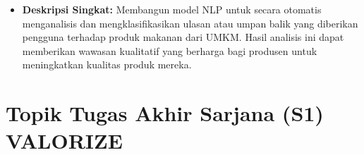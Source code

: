 \documentclass[
  letterpaper,
  DIV=11,
  numbers=noendperiod]{scrreprt}
\providecommand{\tightlist}{%
  \setlength{\itemsep}{0pt}\setlength{\parskip}{0pt}}
\begin{document}
\begin{enumerate}
  \begin{itemize}
  \tightlist
  \item
    \textbf{Deskripsi Singkat:} Membangun model NLP untuk secara
    otomatis menganalisis dan mengklasifikasikan ulasan atau umpan balik
    yang diberikan pengguna terhadap produk makanan dari UMKM. Hasil
    analisis ini dapat memberikan wawasan kualitatif yang berharga bagi
    produsen untuk meningkatkan kualitas produk mereka.
  \end{itemize}
\end{enumerate}

\section{Topik Tugas Akhir Sarjana (S1)
VALORIZE}\label{topik-tugas-akhir-sarjana-s1-valorize}
\end{document}

